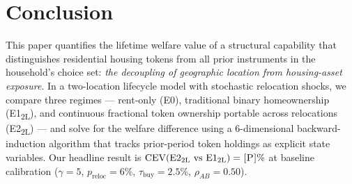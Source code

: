 %
%
%

\section{Conclusion}
\label{sec:conclusion}

This paper quantifies the lifetime welfare value of a structural capability
that distinguishes residential housing tokens from all prior instruments in
the household's choice set: \emph{the decoupling of geographic location from
housing-asset exposure}.
In a two-location lifecycle model with stochastic relocation shocks, we
compare three regimes --- rent-only (E0), traditional binary homeownership
(E1\textsubscript{2L}), and continuous fractional token ownership portable
across relocations (E2\textsubscript{2L}) --- and solve for the welfare
difference using a 6-dimensional backward-induction algorithm that tracks
prior-period token holdings as explicit state variables.
Our headline result is $\text{CEV}(\text{E2}_\text{2L}\ \text{vs}\
\text{E1}_\text{2L}) = \textsc{[P]}\%$ at baseline calibration
($\gamma = 5$, $p_{\text{reloc}} = 6\%$, $\tau_{\text{buy}} = 2.5\%$,
$\rho_{AB} = 0.50$).


